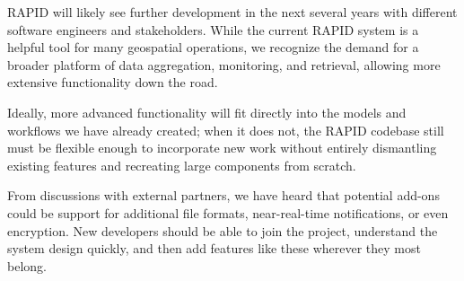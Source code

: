 RAPID will likely see further development in the next several years with different software engineers and stakeholders. While the current RAPID system is a helpful tool for many geospatial operations, we recognize the demand for a broader platform of data aggregation, monitoring, and retrieval, allowing more extensive functionality down the road.

Ideally, more advanced functionality will fit directly into the models and workflows we have already created; when it does not, the RAPID codebase still must be flexible enough to incorporate new work without entirely dismantling existing features and recreating large components from scratch.

From discussions with external partners, we have heard that potential add-ons could be support for additional file formats, near-real-time notifications, or even encryption. New developers should be able to join the project, understand the system design quickly, and then add features like these wherever they most belong.